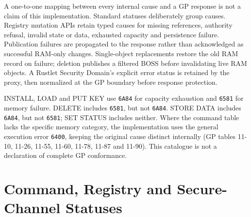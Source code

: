 A one-to-one mapping between every internal cause and a GP response is not a
claim of this implementation. Standard statuses deliberately group causes.
Registry mutation APIs retain typed causes for missing references, authority
refusal, invalid state or data, exhausted capacity and persistence failure.
Publication failures are propagated to the response rather than acknowledged
as successful RAM-only changes. Single-object replacements restore the old RAM
record on failure; deletion publishes a filtered BOSS before invalidating live
RAM objects. A Rustlet Security Domain's explicit error status is retained by
the proxy, then normalized at the GP boundary before response protection.

INSTALL, LOAD and PUT KEY use \texttt{6A84} for capacity exhaustion and
\texttt{6581} for memory failure. DELETE includes \texttt{6581}, but not
\texttt{6A84}. STORE DATA includes \texttt{6A84}, but not \texttt{6581};
SET STATUS includes neither. Where the command table lacks the specific
memory category, the implementation uses the general execution error
\texttt{6400}, keeping the original cause distinct internally
(GP tables 11-10, 11-26, 11-55, 11-60, 11-78, 11-87 and 11-90).
This catalogue is not a declaration of complete GP conformance.

\section{Command, Registry and Secure-Channel Statuses}

